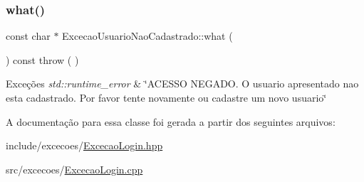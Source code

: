 \subsubsection{\texorpdfstring{what()}{what()}}
{\footnotesize\ttfamily const char $\ast$ Excecao\+Usuario\+Nao\+Cadastrado\+::what (\begin{DoxyParamCaption}{ }\end{DoxyParamCaption}) const throw ( ) \hspace{0.3cm}{\ttfamily [virtual]}}


\begin{DoxyExceptions}{Exceções}
{\em std\+::runtime\+\_\+error} & \char`\"{}\+A\+C\+E\+S\+S\+O N\+E\+G\+A\+D\+O. O usuario apresentado nao esta cadastrado. Por favor tente novamente ou cadastre um novo usuario\char`\"{} \\
\hline
\end{DoxyExceptions}


A documentação para essa classe foi gerada a partir dos seguintes arquivos\+:\begin{DoxyCompactItemize}
\item 
include/excecoes/\mbox{\hyperlink{_excecao_login_8hpp}{Excecao\+Login.\+hpp}}\item 
src/excecoes/\mbox{\hyperlink{_excecao_login_8cpp}{Excecao\+Login.\+cpp}}\end{DoxyCompactItemize}
